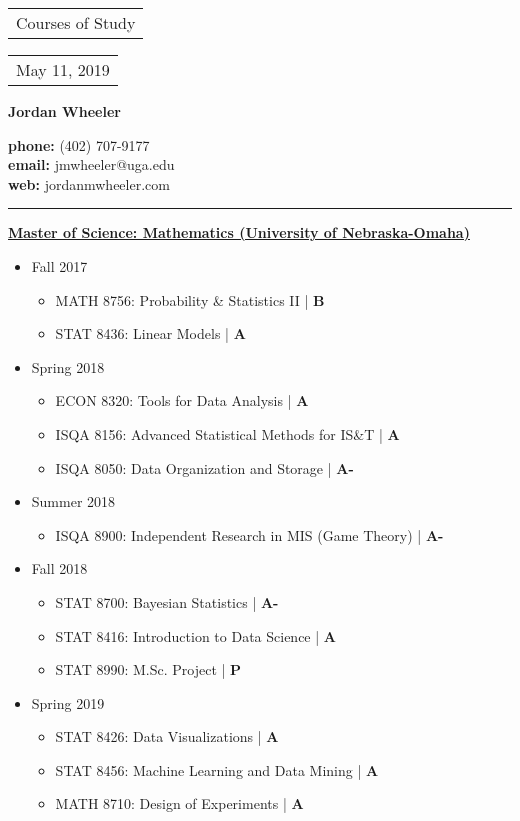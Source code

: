 \documentclass[10pt]{article}
\begin{document}
\vfill\noindent
\begin{tabular}[t]{@{}l} 
Courses of Study
\end{tabular}
\hfill%
\begin{tabular}[t]{l@{}}
May 11, 2019
\end{tabular}

\begin{center}
\begin{Large}
\textbf{Jordan Wheeler}\\
\end{Large}
\textbf{phone:} (402) 707-9177\\
\textbf{email:} jmwheeler@uga.edu\\
\textbf{web:} jordanmwheeler.com\\
\noindent\rule{13cm}{0.4pt}
\end{center}


\underline{\textbf{Master of Science: Mathematics (University of Nebraska-Omaha)}}

\renewcommand\labelitemii{$\circ$}
\renewcommand\labelitemiii{\tiny$\blacksquare$}
\begin{itemize}
\item Fall 2017
\begin{itemize}
\item MATH 8756: Probability \& Statistics II | \textbf{B}
\item STAT 8436: Linear Models | \textbf{A}
\end{itemize}
\item Spring 2018
\begin{itemize}
\item ECON 8320: Tools for Data Analysis | \textbf{A}
\item ISQA 8156: Advanced Statistical Methods for IS\&T | \textbf{A}
\item ISQA 8050: Data Organization and Storage | \textbf{A-}
\end{itemize}
\item Summer 2018
\begin{itemize}
\item ISQA 8900: Independent Research in MIS (Game Theory) | \textbf{A-}
\end{itemize}
\item Fall 2018
\begin{itemize}
\item STAT 8700: Bayesian Statistics | \textbf{A-}
\item STAT 8416: Introduction to Data Science | \textbf{A}
\item STAT 8990: M.Sc. Project | \textbf{P}
\end{itemize}
\item Spring 2019
\begin{itemize}
\item STAT 8426: Data Visualizations | \textbf{A}
\item STAT 8456: Machine Learning and Data Mining | \textbf{A}
\item MATH 8710: Design of Experiments | \textbf{A}
\end{itemize}
\end{itemize}
\text{}\\
\end{document}
